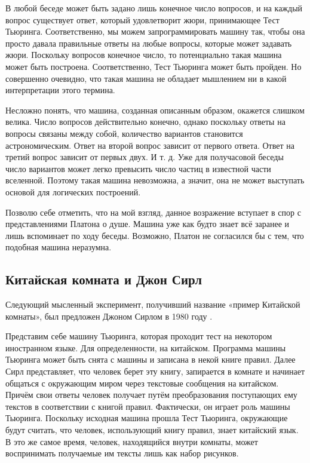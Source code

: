 \documentclass[a4paper,14pt]{scrartcl}
\begin{document}
В любой беседе может быть задано лишь конечное число вопросов, и на каждый вопрос существует ответ, который удовлетворит жюри, принимающее Тест Тьюринга. Соответственно, мы можем запрограммировать машину так, чтобы она просто давала правильные ответы на любые вопросы, которые может задавать жюри. Поскольку вопросов конечное число, то потенциально такая машина может быть построена. Соответственно, Тест Тьюринга может быть пройден. Но совершенно очевидно, что такая машина не обладает мышлением ни в какой интерпретации этого термина. 

Несложно понять, что машина, созданная описанным образом, окажется слишком велика. Число вопросов действительно конечно, однако поскольку ответы на вопросы связаны между собой, количество вариантов становится астрономическим. Ответ на второй вопрос зависит от первого ответа. Ответ на третий вопрос зависит от первых двух. И т. д. Уже для получасовой беседы число вариантов может легко превысить число частиц в известной части вселенной. Поэтому такая машина невозможна, а значит, она не может выступать основой для логических построений.

Позволю себе отметить, что на мой взгляд, данное возражение вступает в спор с представлениями Платона о душе. Машина уже как будто знает всё заранее и лишь вспоминает по ходу беседы. Возможно, Платон не согласился бы с тем, что подобная машина неразумна.

\subsection{Китайская комната и Джон Сирл}

Следующий мысленный эксперимент, получивший название «пример Китайской комнаты», был предложен Джоном Сирлом в 1980 году \cite{searle_1980}.

Представим себе машину Тьюринга, которая проходит тест на некотором иностранном языке. Для определенности, на китайском. Программа машины Тьюринга может быть снята с машины и записана в некой книге правил. Далее Сирл представляет, что человек берет эту книгу, запирается в комнате и начинает общаться с окружающим миром через текстовые сообщения на китайском. Причём свои ответы человек получает путём преобразования поступающих ему текстов в соответствии с книгой правил. Фактически, он играет роль машины Тьюринга. Поскольку исходная машина прошла Тест Тьюринга, окружающие будут считать, что человек, использующий книгу правил, знает китайский язык. В это же самое время, человек, находящийся внутри комнаты, может воспринимать получаемые им тексты лишь как набор рисунков.
\end{document}
